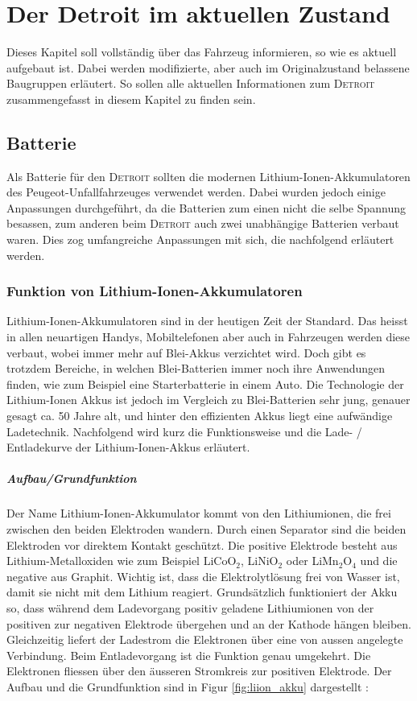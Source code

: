 \chapter{Der Detroit im aktuellen Zustand}\label{aktuell}

Dieses Kapitel soll vollständig über das Fahrzeug informieren, so wie es aktuell aufgebaut ist. Dabei werden modifizierte, aber auch im Originalzustand belassene Baugruppen erläutert. So sollen alle aktuellen Informationen zum \textsc{Detroit} zusammengefasst in diesem Kapitel zu finden sein.

\section{Batterie}
Als Batterie für den \textsc{Detroit} sollten die modernen Lithium-Ionen-Akkumulatoren des Peugeot-Unfallfahrzeuges verwendet werden. Dabei wurden jedoch einige Anpassungen durchgeführt, da die Batterien zum einen nicht die selbe Spannung besassen, zum anderen beim \textsc{Detroit} auch zwei unabhängige Batterien verbaut waren. Dies zog umfangreiche Anpassungen mit sich, die nachfolgend erläutert werden.

\subsection{Funktion von Lithium-Ionen-Akkumulatoren} \label{kap_liion}

Lithium-Ionen-Akkumulatoren sind in der heutigen Zeit der Standard. Das heisst in allen neuartigen Handys, Mobiltelefonen aber auch in Fahrzeugen werden diese verbaut, wobei immer mehr auf Blei-Akkus verzichtet wird. Doch gibt es trotzdem Bereiche, in welchen Blei-Batterien immer noch ihre Anwendungen finden, wie zum Beispiel eine Starterbatterie in einem Auto. Die Technologie der Lithium-Ionen Akkus ist jedoch im Vergleich zu Blei-Batterien sehr jung, genauer gesagt ca. 50 Jahre alt, und hinter den effizienten Akkus liegt eine aufwändige Ladetechnik. Nachfolgend wird kurz die Funktionsweise und die Lade- / Entladekurve der Lithium-Ionen-Akkus erläutert.

\paragraph{Aufbau/Grundfunktion}
Der Name Lithium-Ionen-Akkumulator kommt von den Lithiumionen, die frei zwischen den beiden Elektroden wandern. Durch einen Separator sind die beiden Elektroden vor direktem Kontakt geschützt. Die positive Elektrode besteht aus Lithium-Metalloxiden wie zum Beispiel LiCoO$_2$, LiNiO$_2$ oder LiMn$_2$O$_4$ und die negative aus Graphit. Wichtig ist, dass die Elektrolytlösung frei von Wasser ist, damit sie nicht mit dem Lithium reagiert.
Grundsätzlich funktioniert der Akku so, dass während dem Ladevorgang positiv geladene Lithiumionen von der positiven zur negativen Elektrode übergehen und an der Kathode hängen bleiben. Gleichzeitig liefert der Ladestrom die Elektronen über eine von aussen angelegte Verbindung. Beim Entladevorgang ist die Funktion genau umgekehrt. Die Elektronen fliessen über den äusseren Stromkreis zur positiven Elektrode. Der Aufbau und die Grundfunktion sind in Figur \ref{fig:liion_akku} dargestellt \cite{liion_akku_aufbau_funktion2}:

